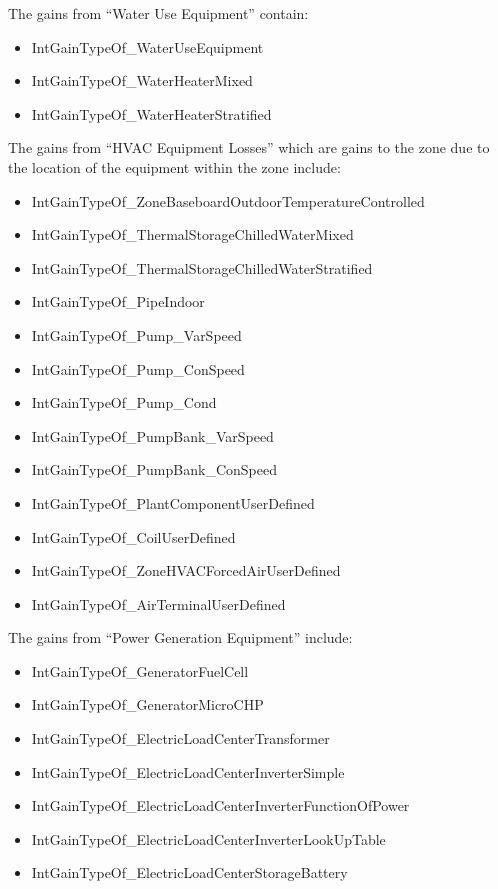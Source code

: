 The gains from ``Water Use Equipment'' contain:

\begin{itemize}
\item
  IntGainTypeOf\_WaterUseEquipment
\item
  IntGainTypeOf\_WaterHeaterMixed
\item
  IntGainTypeOf\_WaterHeaterStratified
\end{itemize}

The gains from ``HVAC Equipment Losses'' which are gains to the zone due to the location of the equipment within the zone include:

\begin{itemize}
\item
  IntGainTypeOf\_ZoneBaseboardOutdoorTemperatureControlled
\item
  IntGainTypeOf\_ThermalStorageChilledWaterMixed
\item
  IntGainTypeOf\_ThermalStorageChilledWaterStratified
\item
  IntGainTypeOf\_PipeIndoor
\item
  IntGainTypeOf\_Pump\_VarSpeed
\item
  IntGainTypeOf\_Pump\_ConSpeed
\item
  IntGainTypeOf\_Pump\_Cond
\item
  IntGainTypeOf\_PumpBank\_VarSpeed
\item
  IntGainTypeOf\_PumpBank\_ConSpeed
\item
  IntGainTypeOf\_PlantComponentUserDefined
\item
  IntGainTypeOf\_CoilUserDefined
\item
  IntGainTypeOf\_ZoneHVACForcedAirUserDefined
\item
  IntGainTypeOf\_AirTerminalUserDefined
\end{itemize}

The gains from ``Power Generation Equipment'' include:

\begin{itemize}
\item
  IntGainTypeOf\_GeneratorFuelCell
\item
  IntGainTypeOf\_GeneratorMicroCHP
\item
  IntGainTypeOf\_ElectricLoadCenterTransformer
\item
  IntGainTypeOf\_ElectricLoadCenterInverterSimple
\item
  IntGainTypeOf\_ElectricLoadCenterInverterFunctionOfPower
\item
  IntGainTypeOf\_ElectricLoadCenterInverterLookUpTable
\item
  IntGainTypeOf\_ElectricLoadCenterStorageBattery
\end{itemize}

